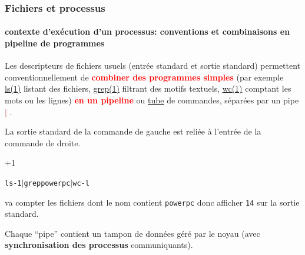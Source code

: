 \documentclass[xcolor=svgnames,final,smaller,a4]{beamer}
\begin{document}
\begin{frame}
  \frametitle{Fichiers et processus}
  \framesubtitle{contexte d'exécution d'un processus: conventions et combinaisons en pipeline de programmes}


  Les descripteurs de fichiers usuels (entrée standard et sortie
  standard) permettent conventionnellement de
  {\textcolor{red}{\textbf{combiner des programmes simples}}} (par
  exemple
  \href{https://man7.org/linux/man-pages/man1/ls.1.html}{ls(1)}
  listant des fichiers,
  \href{https://man7.org/linux/man-pages/man1/grep.1.html}{grep(1)}
  filtrant des motifs textuels,
  \href{https://man7.org/linux/man-pages/man1/wc.1.html}{wc(1)}
  comptant les mots ou les lignes)  {\textcolor{red}{\textbf{en un pipeline}}} ou
  \href{https://fr.wikipedia.org/wiki/Tube_(informatique)}{tube} de
  commandes, séparées par un pipe \textcolor{FireBrick}{$\vert$}
  {}.

  La sortie standard de la commande de gauche est reliée à l'entrée de
  la commande de droite.

  \begin{relsize}{+1}
\begin{alltt}
\hspace{1cm} ls -1 $\vert$ grep powerpc $\vert$ wc -l 
\end{alltt}
  \end{relsize}
  
  va compter les fichiers dont le nom contient \texttt{powerpc} donc afficher \texttt{14} sur la sortie standard.

  \vspace{0.5cm}
  
  Chaque ``pipe'' contient un tampon de données géré par le noyau
  (avec \textbf{synchronisation des processus} communiquants).

\end{frame}
\end{document}
